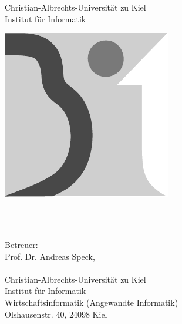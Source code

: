 
\begin{titlepage}

  \begin{center}    
      \LARGE Christian-Albrechts-Universität zu Kiel\\
      \vspace{0.2cm}
      \large Institut für Informatik\\ 
    \begin{LARGE}
    \vspace*{2.5cm}
    \includegraphics[width=.3\linewidth]{Images/Basic/BitLogo_sw.pdf}

    \vspace*{2.5cm}
    \doublespacing
    \bitType\\
    \vspace*{0.3cm}
    {\sffamily\bfseries\bitTitle}
    \singlespacing
    \end{LARGE}
    \vspace{-0.25cm}
    {\LARGE \bitAuthor}\\[1.5cm]
    \vfill
    {\small Betreuer:}\\[0.1cm] 
    {Prof. Dr. Andreas Speck,}\\[0.1cm]
    {\bitZweitbetreuer}\\[0.5cm]
    {\small Christian-Albrechts-Universität zu Kiel\\
			Institut für Informatik\\
			Wirtschaftsinformatik (Angewandte Informatik)\\
		  	Olshausenstr. 40, 24098 Kiel
	}\\[0.5cm]
			
	{\bitDeadline}
  \end{center}
\end{titlepage} 
